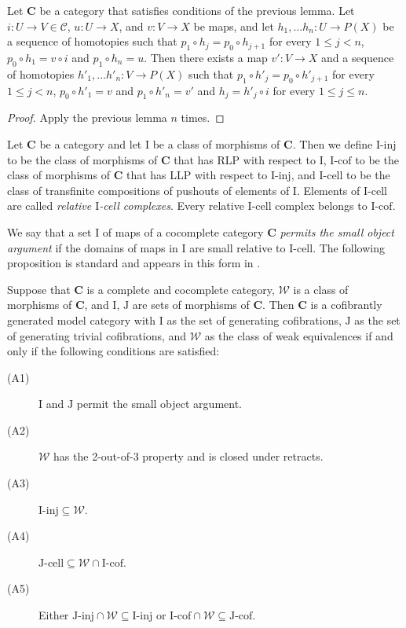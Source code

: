 \documentclass{tac}
\theoremstyle{definition}
\newcommand{\we}{\mathcal{W}}
\newcommand{\cof}{\mathcal{C}}
\newcommand{\cat}[1]{\mathbf{#1}}
\newcommand{\C}{\cat{C}}
\newcommand{\I}{\mathrm{I}}
\newcommand{\J}{\mathrm{J}}
\newcommand{\class}[2]{#1\text{-}\mathrm{#2}}
\newcommand{\Iinj}[1][\I]{\class{#1}{inj}}
\newcommand{\Icell}[1][\I]{\class{#1}{cell}}
\newcommand{\Icof}[1][\I]{\class{#1}{cof}}
\newcommand{\Jinj}[1][]{\Iinj[\J#1]}
\newcommand{\Jcell}[1][]{\Icell[\J#1]}
\newcommand{\Jcof}[1][]{\Icof[\J#1]}
\begin{document}
\begin{lem}
Let $\C$ be a category that satisfies conditions of the previous lemma.
Let $i : U \to V \in \cof$, $u : U \to X$, and $v : V \to X$ be maps, and let $h_1, \ldots h_n : U \to P(X)$ be a sequence of homotopies
such that $p_1 \circ h_j = p_0 \circ h_{j+1}$ for every $1 \leq j < n$, $p_0 \circ h_1 = v \circ i$ and $p_1 \circ h_n = u$.
Then there exists a map $v' : V \to X$ and a sequence of homotopies $h'_1, \ldots h'_n : V \to P(X)$
such that $p_1 \circ h'_j = p_0 \circ h'_{j+1}$ for every $1 \leq j < n$, $p_0 \circ h'_1 = v$ and $p_1 \circ h'_n = v'$ and $h_j = h'_j \circ i$ for every $1 \leq j \leq n$.
\end{lem}
\begin{proof}
Apply the previous lemma $n$ times.
\end{proof}

Let $\C$ be a category and let $\I$ be a class of morphisms of $\C$.
Then we define $\Iinj$ to be the class of morphisms of $\C$ that has RLP with respect to $\I$,
$\Icof$ to be the class of morphisms of $\C$ that has LLP with respect to $\Iinj$, and
$\Icell$ to be the class of transfinite compositions of pushouts of elements of $\I$.
Elements of $\Icell$ are called \emph{relative $\I$-cell complexes}.
Every relative $\I$-cell complex belongs to $\Icof$.

We say that a set $\I$ of maps of a cocomplete category $\C$ \emph{permits the small object argument}
if the domains of maps in $\I$ are small relative to $\Icell$.
The following proposition is standard and appears in this form in \cite{hovey}.

\begin{prop}
Suppose that $\C$ is a complete and cocomplete category, $\we$ is a class of morphisms of $\C$, and $\I$, $\J$ are sets of morphisms of $\C$.
Then $\C$ is a cofibrantly generated model category with $\I$ as the set of generating cofibrations,
$\J$ as the set of generating trivial cofibrations, and $\we$ as the class of weak equivalences if and only if the following conditions are satisfied:
\begin{description}
\item[(A1)] $\I$ and $\J$ permit the small object argument.
\item[(A2)] $\we$ has the 2-out-of-3 property and is closed under retracts.
\item[(A3)] $\Iinj \subseteq \we$.
\item[(A4)] $\Jcell \subseteq \we \cap \Icof$.
\item[(A5)] Either $\Jinj \cap \we \subseteq \Iinj$ or $\Icof \cap \we \subseteq \Jcof$.
\end{description}
\end{prop}
\end{document}
